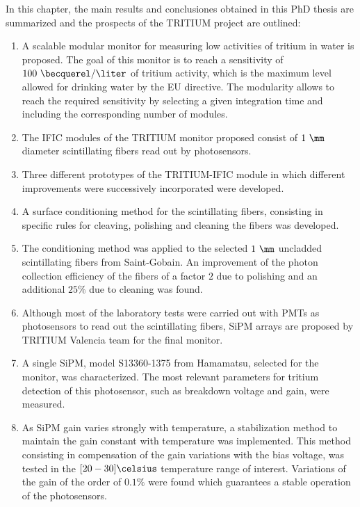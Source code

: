 In this chapter, the main results and conclusiones obtained in this PhD thesis are summarized and the prospects of the TRITIUM project are outlined:

\begin{enumerate}
\item{} A scalable modular monitor for measuring low activities of tritium in water is proposed. The goal of this monitor is to reach a sensitivity of $100~\becquerel/\liter$ of tritium activity, which is the maximum level allowed for drinking water by the EU directive. The modularity allows to reach the required sensitivity by selecting a given integration time and including the corresponding number of modules.

\item{} The IFIC modules of the TRITIUM monitor proposed consist of $1~\mm$ diameter scintillating fibers read out by photosensors.

\item{} Three different prototypes of the TRITIUM-IFIC module in which different improvements were successively incorporated were developed.

\item{} A surface conditioning method for the scintillating fibers, consisting in specific rules for cleaving, polishing and cleaning the fibers was developed.

\item{} The conditioning method was applied to the selected $1~\mm$ uncladded scintillating fibers from Saint-Gobain. An improvement of the photon collection efficiency of the fibers of a factor $2$ due to polishing and an additional $25\%$ due to cleaning was found.

\item{} Although most of the laboratory tests were carried out with PMTs as photosensors to read out the scintillating fibers, SiPM arrays are proposed by TRITIUM Valencia team for the final monitor. 

\item{} A single SiPM, model S13360-1375 from Hamamatsu, selected for the monitor, was characterized. The most relevant parameters for tritium detection of this photosensor, such as breakdown voltage and gain, were measured.

\item{} As SiPM gain varies strongly with temperature, a stabilization method to maintain the gain constant with temperature was implemented. This method consisting in compensation of the gain variations with the bias voltage, was tested in the $[20-30]\celsius$ temperature range of interest. Variations of the gain of the order of $0.1\%$ were found which guarantees a stable operation of the photosensors.


\end{enumerate}

